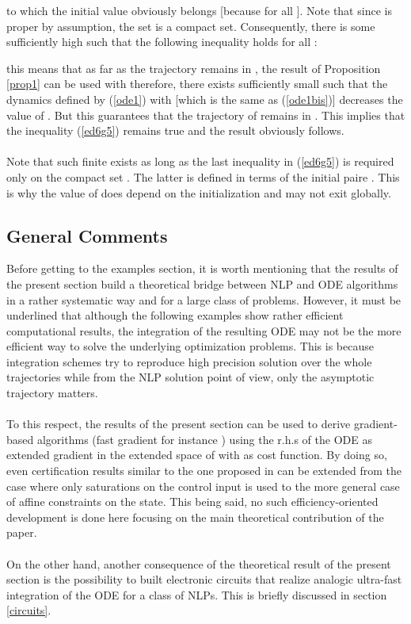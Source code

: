 \documentclass{article}
\begin{document}
to which the initial value  obviously belongs [because  for all ]. Note that since  is proper by assumption, the set  is a compact set. Consequently, there is some sufficiently high  such that the following inequality holds for all :
 
this means that as far as the trajectory remains in , the result of Proposition \ref{prop1} can be used with  therefore, there exists sufficiently small  such that the dynamics defined by (\ref{ode1}) with  [which is the same as (\ref{ode1bis})] decreases the value of . But this guarantees that the trajectory of  remains in . This implies that the inequality (\ref{ed6g5}) remains true and the result obviously follows.      \ \\ \ \\ 
Note that such finite  exists as long as the last inequality in (\ref{ed6g5}) is required only on the compact set . The latter is defined in terms of the initial paire . This is why the value of  does depend on the initialization and may not exit globally. 
\subsection{General Comments}
\noindent Before getting to the examples section, it is worth mentioning that the results of the present section build a theoretical bridge between NLP and ODE algorithms in a rather systematic way and for a large class of problems. However, it must be underlined that although the following examples show rather efficient computational results, the integration of the resulting ODE may not be the more efficient way to solve the underlying optimization problems. This is because integration schemes try to reproduce high precision solution over the whole trajectories while from the NLP solution point of view, only the asymptotic trajectory matters. \ \\ \ \\ 
To this respect, the results of the present section can be used to derive gradient-based algorithms (fast gradient for instance \cite{Nesterov1983,Nesterov:04}) using the r.h.s of the ODE as extended gradient in the extended space of  with  as cost function. By doing so, even certification results similar to the one proposed in \cite{Richter:2012} can be extended from the case where only saturations on the control input is used to the more general case of affine constraints on the state. This being said, no such efficiency-oriented development is done here focusing on the main theoretical contribution of the paper. \ \\ \ \\ 
On the other hand, another consequence of the theoretical result of the present section is the possibility to built electronic circuits that realize analogic ultra-fast integration of the ODE for a class of NLPs. This is briefly discussed in section \ref{circuits}. 
\end{document}
